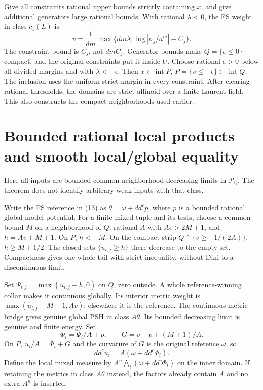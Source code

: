 \documentclass[
  10pt,
]{article}
\begin{document}
Give all constraints rational upper bounds strictly containing \(x\),
and give additional generators large rational bounds. With rational
\(\lambda<0\), the FS weight in class \(c_1(L)\) is
\[v=\frac1{dm}\max\{dm\lambda,\log|\sigma_j/a^m|-C_j\}. \tag{13}\] The
constraint bound is \(C_j\), not \(dmC_j\). Generator bounds make
\(Q=\{v\le0\}\) compact, and the original constraints put it inside
\(U\). Choose rational \(\epsilon>0\) below all divided margins and with
\(\lambda<-\epsilon\). Then \(x\in\operatorname{int}P\),
\(P=\{v\le-\epsilon\}\subset\operatorname{int}Q\). The inclusion uses
the uniform strict margin in every constraint. After clearing rational
thresholds, the domains are strict affinoid over a finite Laurent field.
This also constructs the compact neighborhoods used earlier.

\section{Bounded rational local products and smooth local/global
equality}\label{bounded-rational-local-products-and-smooth-localglobal-equality}

Here all inputs are bounded common-neighborhood decreasing limits in
\(\mathcal P_{\mathbb Q}\). The theorem does not identify arbitrary weak
inputs with that class.

Write the FS reference in (13) as \(\theta=\omega+dd^cp\), where \(p\)
is a bounded rational global model potential. For a finite mixed tuple
and its tests, choose a common bound \(M\) on a neighborhood of \(Q\),
rational \(A\) with \(A\epsilon>2M+1\), and \(h=Av+M+1\). On \(P\),
\(h<-M\). On the compact strip \(Q\cap\{v\ge-1/(2A)\}\), \(h\ge M+1/2\).
The closed sets \(\{u_{i,j}\ge h\}\) there decrease to the empty set.
Compactness gives one whole tail with strict inequality, without Dini to
a discontinuous limit.

Set \(\Psi_{i,j}=\max(u_{i,j}-h,0)\) on \(Q\), zero outside. A whole
reference-winning collar makes it continuous globally. Its interior
metric weight is \(\max(u_{i,j}-M-1,Av)\); elsewhere it is the
reference. The continuous metric bridge gives genuine global PSH in
class \(A\theta\). Its bounded decreasing limit is genuine and finite
energy. Set \[\Phi_i=\Psi_i/A+p,\qquad G=v-p+(M+1)/A. \tag{14}\] On
\(P\), \(u_i/A=\Phi_i+G\) and the curvature of \(G\) is the original
reference \(\omega\), so \[dd^cu_i=A(\omega+dd^c\Phi_i). \tag{15}\]
Define the local mixed measure by \(A^n\bigwedge_i(\omega+dd^c\Phi_i)\)
on the inner domain. If retaining the metrics in class \(A\theta\)
instead, the factors already contain \(A\) and no extra \(A^n\) is
inserted.
\end{document}
